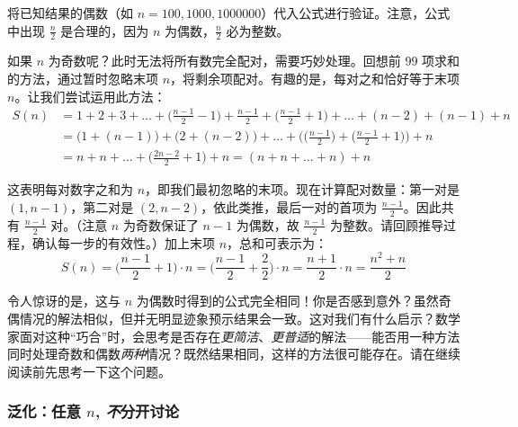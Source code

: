 将已知结果的偶数（如 $n=100, 1000, 1000000$）代入公式进行验证。注意，公式中出现 $\frac{n}{2}$ 是合理的，因为 $n$ 为偶数，$\frac{n}{2}$ 必为整数。

如果 $n$ 为奇数呢？此时无法将所有数完全配对，需要巧妙处理。回想前 $99$ 项求和的方法，通过暂时忽略末项 $n$，将剩余项配对。有趣的是，每对之和恰好等于末项 $n$。让我们尝试运用此方法：
\begin{align*}
    S(n) &= 1 + 2 + 3 + \dots + \Big(\frac{n-1}{2}-1\Big) + \frac{n-1}{2} + \Big(\frac{n-1}{2}+1\Big) + \dots + (n - 2) + (n - 1) + n\\
    &=  \big(1 + (n-1)\big) + \big(2 + (n - 2)\big) + \dots + \Big(\big(\frac{n-1}{2}\big)+\big(\frac{n-1}{2}+1\big)\Big) + n \\
    &= n+n+ \dots + \Big(\frac{2n-2}{2}+1\Big) +n = (n+n+\dots+n)+n
\end{align*}

这表明每对数字之和为 $n$，即我们最初忽略的末项。现在计算配对数量：第一对是 $(1, n - 1)$，第二对是 $(2, n - 2)$，依此类推，最后一对的首项为 $\frac{n-1}{2}$。因此共有 $\frac{n-1}{2}$ 对。（注意 $n$ 为奇数保证了 $n-1$ 为偶数，故 $\frac{n-1}{2}$ 为整数。请回顾推导过程，确认每一步的有效性。）加上末项 $n$，总和可表示为：
\[S(n) = \Big(\frac{n-1}{2} + 1\Big) \cdot n = \Big(\frac{n-1}{2} + \frac{2}{2}\Big) \cdot n = \frac{n+1}{2} \cdot n = \frac{n^2+n}{2}\] 

令人惊讶的是，这与 $n$ 为偶数时得到的公式完全相同！你是否感到意外？虽然奇偶情况的解法相似，但并无明显迹象预示结果会一致。这对我们有什么启示？数学家面对这种``巧合''时，会思考是否存在\emph{更简洁}、\emph{更普适}的解法——能否用一种方法同时处理奇数和偶数\emph{两种}情况？既然结果相同，这样的方法很可能存在。请在继续阅读前先思考一下这个问题。

\subsubsection*{泛化：任意 $n$, \emph{不}分开讨论}

